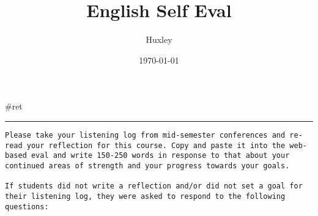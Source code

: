 \documentclass[letterpaper]{article}
\author{Huxley}
\date{\today}
\title{English Self Eval}
\renewcommand\maketitle{}
\begin{document}
\maketitle
\#ret

\noindent\rule{\textwidth}{0.5pt}

\begin{verbatim}
Please take your listening log from mid-semester conferences and re-read your reflection for this course. Copy and paste it into the web-based eval and write 150-250 words in response to that about your continued areas of strength and your progress towards your goals.

If students did not write a reflection and/or did not set a goal for their listening log, they were asked to respond to the following questions: 
\end{verbatim}
\end{document}
